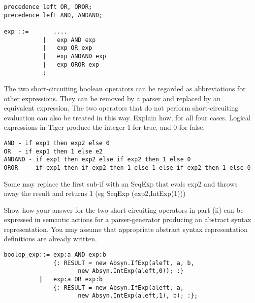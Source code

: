 \documentclass[11pt]{cityexam}
\begin{document}
\begin{questions}
\begin{subquestions}
\begin{subsubquestions}
\begin{modelanswer}
\begin{verbatim}
precedence left OR, OROR;
precedence left AND, ANDAND;

exp ::=       .... 
           |   exp AND exp
           |   exp OR exp
           |   exp ANDAND exp
           |   exp OROR exp
           ;
\end{verbatim}
\end{modelanswer}

\subsubquestion
The two short-circuiting boolean operators can be regarded as abbreviations 
for other expressions. They can be removed by a parser and replaced by an
equivalent expression. The two operators that do not perform 
short-circuiting evaluation can also be treated in this way. Explain how,
for all four cases. Logical expressions in Tiger produce the integer 1 
for true, and 0 for false.

\begin{modelanswer}
\begin{verbatim}
AND - if exp1 then exp2 else 0
OR  - if exp1 then 1 else e2
ANDAND - if exp1 then exp2 else if exp2 then 1 else 0
OROR   - if exp1 then if exp2 then 1 else 1 else if exp2 then 1 else 0
\end{verbatim}
Some may replace the first sub-if with an SeqExp that evals exp2 and 
throws away the result and returns 1 (eg SeqExp (exp2,IntExp(1)))
\end{modelanswer}

\subsubquestion
Show how your answer for the two
short-circuiting operators in part (ii) can be expressed in semantic 
actions for a parser-generator producing an abstract syntax representation.
You may assume that appropriate abstract syntax 
representation definitions are already written.

\begin{modelanswer}
\begin{verbatim}
boolop_exp::= exp:a AND exp:b   
              {: RESULT = new Absyn.IfExp(aleft, a, b, 
                     new Absyn.IntExp(aleft,0)); :}
          |   exp:a OR exp:b    
              {: RESULT = new Absyn.IfExp(aleft, a, 
                     new Absyn.IntExp(aleft,1), b); :};
\end{verbatim}
\end{modelanswer}

\end{subsubquestions}

\end{subquestions}

\end{questions}
\end{document}
